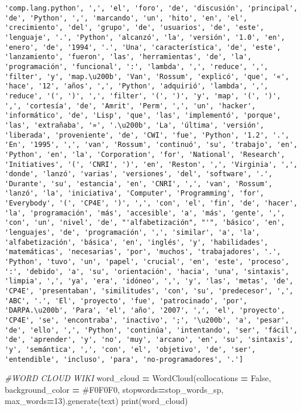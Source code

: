 \documentclass[
]{article}
\newenvironment{Shaded}{\begin{snugshade}}{\end{snugshade}}
\newcommand{\BuiltInTok}[1]{#1}
\newcommand{\CommentTok}[1]{\textcolor[rgb]{0.56,0.35,0.01}{\textit{#1}}}
\newcommand{\DecValTok}[1]{\textcolor[rgb]{0.00,0.00,0.81}{#1}}
\newcommand{\NormalTok}[1]{#1}
\newcommand{\OperatorTok}[1]{\textcolor[rgb]{0.81,0.36,0.00}{\textbf{#1}}}
\newcommand{\StringTok}[1]{\textcolor[rgb]{0.31,0.60,0.02}{#1}}
\newcommand{\VariableTok}[1]{\textcolor[rgb]{0.00,0.00,0.00}{#1}}
\begin{document}
\begin{verbatim}
'comp.lang.python', ',', 'el', 'foro', 'de', 'discusión', 'principal', 'de', 'Python', ',', 'marcando', 'un', 'hito', 'en', 'el', 'crecimiento', 'del', 'grupo', 'de', 'usuarios', 'de', 'este', 'lenguaje', '.', 'Python', 'alcanzó', 'la', 'versión', '1.0', 'en', 'enero', 'de', '1994', '.', 'Una', 'característica', 'de', 'este', 'lanzamiento', 'fueron', 'las', 'herramientas', 'de', 'la', 'programación', 'funcional', ':', 'lambda', ',', 'reduce', ',', 'filter', 'y', 'map.\u200b', 'Van', 'Rossum', 'explicó', 'que', '«', 'hace', '12', 'años', ',', 'Python', 'adquirió', 'lambda', ',', 'reduce', '(', ')', ',', 'filter', '(', ')', 'y', 'map', '(', ')', ',', 'cortesía', 'de', 'Amrit', 'Perm', ',', 'un', 'hacker', 'informático', 'de', 'Lisp', 'que', 'las', 'implementó', 'porque', 'las', 'extrañaba', '»', '.\u200b', 'La', 'última', 'versión', 'liberada', 'proveniente', 'de', 'CWI', 'fue', 'Python', '1.2', '.', 'En', '1995', ',', 'van', 'Rossum', 'continuó', 'su', 'trabajo', 'en', 'Python', 'en', 'la', 'Corporation', 'for', 'National', 'Research', 'Initiatives', '(', 'CNRI', ')', 'en', 'Reston', ',', 'Virginia', ',', 'donde', 'lanzó', 'varias', 'versiones', 'del', 'software', '.', 'Durante', 'su', 'estancia', 'en', 'CNRI', ',', 'van', 'Rossum', 'lanzó', 'la', 'iniciativa', 'Computer', 'Programming', 'for', 'Everybody', '(', 'CP4E', ')', ',', 'con', 'el', 'fin', 'de', 'hacer', 'la', 'programación', 'más', 'accesible', 'a', 'más', 'gente', ',', 'con', 'un', 'nivel', 'de', "'alfabetización", "'", 'básico', 'en', 'lenguajes', 'de', 'programación', ',', 'similar', 'a', 'la', 'alfabetización', 'básica', 'en', 'inglés', 'y', 'habilidades', 'matemáticas', 'necesarias', 'por', 'muchos', 'trabajadores', '.', 'Python', 'tuvo', 'un', 'papel', 'crucial', 'en', 'este', 'proceso', ':', 'debido', 'a', 'su', 'orientación', 'hacia', 'una', 'sintaxis', 'limpia', ',', 'ya', 'era', 'idóneo', ',', 'y', 'las', 'metas', 'de', 'CP4E', 'presentaban', 'similitudes', 'con', 'su', 'predecesor', ',', 'ABC', '.', 'El', 'proyecto', 'fue', 'patrocinado', 'por', 'DARPA.\u200b', 'Para', 'el', 'año', '2007', ',', 'el', 'proyecto', 'CP4E', 'se', 'encontraba', 'inactivo', ';', '\u200b', 'a', 'pesar', 'de', 'ello', ',', 'Python', 'continúa', 'intentando', 'ser', 'fácil', 'de', 'aprender', 'y', 'no', 'muy', 'arcano', 'en', 'su', 'sintaxis', 'y', 'semántica', ',', 'con', 'el', 'objetivo', 'de', 'ser', 'entendible', 'incluso', 'para', 'no-programadores', '.']
\end{verbatim}

\begin{Shaded}
\begin{Highlighting}[]
\CommentTok{\#WORD CLOUD WIKI}
\NormalTok{word\_cloud }\OperatorTok{=}\NormalTok{ WordCloud(collocations }\OperatorTok{=} \VariableTok{False}\NormalTok{, background\_color }\OperatorTok{=} \StringTok{\textquotesingle{}\#F0F0F0\textquotesingle{}}\NormalTok{, stopwords}\OperatorTok{=}\NormalTok{stop\_words\_sp, max\_words}\OperatorTok{=}\DecValTok{13}\NormalTok{).generate(text)}
\BuiltInTok{print}\NormalTok{(word\_cloud)}
\end{Highlighting}
\end{Shaded}
\end{document}
